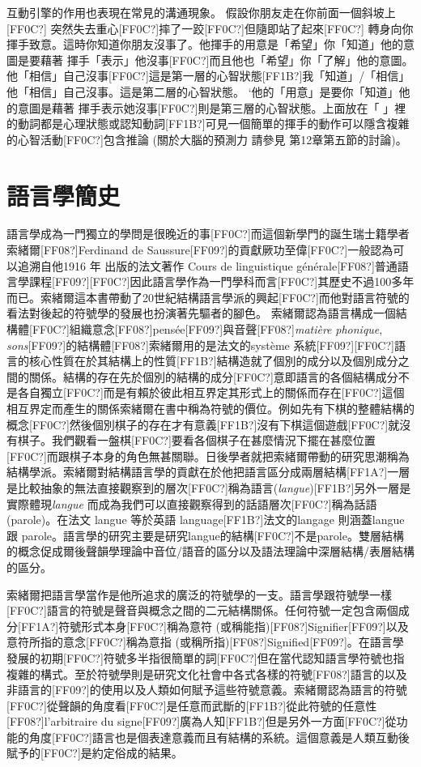 互動引擎的作用也表現在常見的溝通現象。 假設你朋友走在你前面一個斜坡上[FF0C?] 突然失去重心[FF0C?]摔了一跤[FF0C?]但隨即站了起來[FF0C?] 轉身向你揮手致意。這時你知道你朋友沒事了。他揮手的用意是「希望」你「知道」他的意圖是要藉著 揮手「表示」他沒事[FF0C?]而且他也「希望」你「了解」他的意圖。他「相信」自己沒事[FF0C?]這是第一層的心智狀態[FF1B?]我「知道」/「相信」他「相信」自己沒事。這是第二層的心智狀態。 ‘他的「用意」是要你「知道」他的意圖是藉著 揮手表示她沒事[FF0C?]則是第三層的心智狀態。上面放在「  」裡的動詞都是心理狀態或認知動詞[FF1B?]可見一個簡單的揮手的動作可以隱含複雜的心智活動[FF0C?]包含推論 (關於大腦的預測力 請參見 第12章第五節的討論)。    

\section{語言學簡史}

語言學成為一門獨立的學問是很晚近的事[FF0C?]而這個新學門的誕生瑞士籍學者索緒爾[FF08?]Ferdinand de Saussure[FF09?]的貢獻厥功至偉[FF0C?]一般認為可以追溯自他1916 年 出版的法文著作 Cours de linguistique générale[FF08?]普通語言學課程[FF09?][FF0C?]因此語言學作為一門學科而言[FF0C?]其歷史不過100多年而已。索緒爾這本書帶動了20世紀結構語言學派的興起[FF0C?]而他對語言符號的看法對後起的符號學的發展也扮演著先驅者的腳色。 索緒爾認為語言構成一個結構體[FF0C?]組織意念[FF08?]pensée[FF09?]與音聲[FF08?]\textit{matière} \textit{phonique}, \textit{sons}[FF09?]的結構體[FF08?]索緒爾用的是法文的système 系統[FF09?][FF0C?]語言的核心性質在於其結構上的性質[FF1B?]結構造就了個別的成分以及個別成分之間的關係。結構的存在先於個別的結構的成分[FF0C?]意即語言的各個結構成分不是各自獨立[FF0C?]而是有賴於彼此相互界定其形式上的關係而存在[FF0C?]這個相互界定而產生的關係索緒爾在書中稱為符號的價位。例如先有下棋的整體結構的概念[FF0C?]然後個別棋子的存在才有意義[FF1B?]沒有下棋這個遊戲[FF0C?]就沒有棋子。我們觀看一盤棋[FF0C?]要看各個棋子在甚麼情況下擺在甚麼位置[FF0C?]而跟棋子本身的角色無甚關聯。日後學者就把索緒爾帶動的研究思潮稱為結構學派。索緒爾對結構語言學的貢獻在於他把語言區分成兩層結構[FF1A?]一層是比較抽象的無法直接觀察到的層次[FF0C?]稱為語言(\textit{langue})[FF1B?]另外一層是實際體現\textit{langue} 而成為我們可以直接觀察得到的話語層次[FF0C?]稱為話語 (parole)。在法文 langue 等於英語  language[FF1B?]法文的langage 則涵蓋langue 跟 parole。語言學的研究主要是研究langue的結構[FF0C?]不是parole。雙層結構的概念促成爾後聲韻學理論中音位/語音的區分以及語法理論中深層結構/表層結構的區分。  

索緒爾把語言學當作是他所追求的廣泛的符號學的一支。語言學跟符號學一樣[FF0C?]語言的符號是聲音與概念之間的二元結構關係。任何符號一定包含兩個成分[FF1A?]符號形式本身[FF0C?]稱為意符 (或稱能指)[FF08?]Signifier[FF09?]以及意符所指的意念[FF0C?]稱為意指 (或稱所指)[FF08?]Signified[FF09?]。在語言學發展的初期[FF0C?]符號多半指很簡單的詞[FF0C?]但在當代認知語言學符號也指複雜的構式。至於符號學則是研究文化社會中各式各樣的符號[FF08?]語言的以及非語言的[FF09?]的使用以及人類如何賦予這些符號意義。索緒爾認為語言的符號[FF0C?]從聲韻的角度看[FF0C?]是任意而武斷的[FF1B?]從此符號的任意性[FF08?]l'arbitraire du signe[FF09?]廣為人知[FF1B?]但是另外一方面[FF0C?]從功能的角度[FF0C?]語言也是個表達意義而且有結構的系統。這個意義是人類互動後賦予的[FF0C?]是約定俗成的結果。

